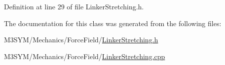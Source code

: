 Definition at line 29 of file Linker\+Stretching.\+h.



The documentation for this class was generated from the following files\+:\begin{DoxyCompactItemize}
\item 
M3\+S\+Y\+M/\+Mechanics/\+Force\+Field/\hyperlink{LinkerStretching_8h}{Linker\+Stretching.\+h}\item 
M3\+S\+Y\+M/\+Mechanics/\+Force\+Field/\hyperlink{LinkerStretching_8cpp}{Linker\+Stretching.\+cpp}\end{DoxyCompactItemize}
